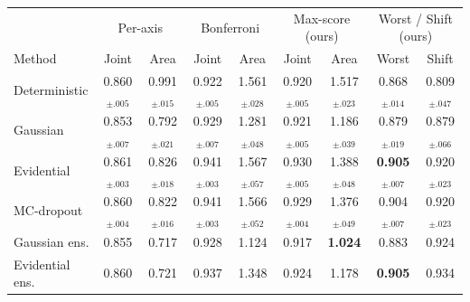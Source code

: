 \begin{tabular}{lcccccccc}
\toprule
 & \multicolumn{2}{c}{Per-axis} & \multicolumn{2}{c}{Bonferroni} & \multicolumn{2}{c}{Max-score (ours)} & \multicolumn{2}{c}{Worst / Shift (ours)} \\
Method & Joint & Area & Joint & Area & Joint & Area & Worst & Shift \\
\midrule
Deterministic & 0.860$_{\pm.005}$ & 0.991$_{\pm.015}$ & 0.922$_{\pm.005}$ & 1.561$_{\pm.028}$ & 0.920$_{\pm.005}$ & 1.517$_{\pm.023}$ & 0.868$_{\pm.014}$ & 0.809$_{\pm.047}$ \\
Gaussian & 0.853$_{\pm.007}$ & 0.792$_{\pm.021}$ & 0.929$_{\pm.007}$ & 1.281$_{\pm.048}$ & 0.921$_{\pm.005}$ & 1.186$_{\pm.039}$ & 0.879$_{\pm.019}$ & 0.879$_{\pm.066}$ \\
Evidential & 0.861$_{\pm.003}$ & 0.826$_{\pm.018}$ & 0.941$_{\pm.003}$ & 1.567$_{\pm.057}$ & 0.930$_{\pm.005}$ & 1.388$_{\pm.048}$ & \textbf{0.905}$_{\pm.007}$ & 0.920$_{\pm.023}$ \\
MC-dropout & 0.860$_{\pm.004}$ & 0.822$_{\pm.016}$ & 0.941$_{\pm.003}$ & 1.566$_{\pm.052}$ & 0.929$_{\pm.004}$ & 1.376$_{\pm.049}$ & 0.904$_{\pm.007}$ & 0.920$_{\pm.023}$ \\
Gaussian ens. & 0.855 & 0.717 & 0.928 & 1.124 & 0.917 & \textbf{1.024} & 0.883 & 0.924 \\
Evidential ens. & 0.860 & 0.721 & 0.937 & 1.348 & 0.924 & 1.178 & \textbf{0.905} & 0.934 \\
\bottomrule
\end{tabular}
